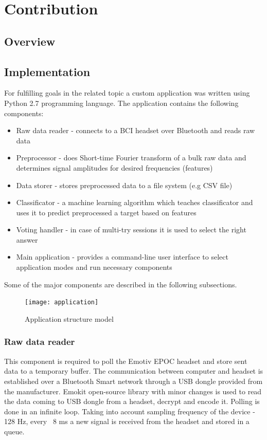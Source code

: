 \documentclass[12pt]{article}
\begin{document}
\newpage
\section{Contribution}

\subsection{Overview}


\subsection{Implementation}

For fulfilling goals in the related topic a custom application was written using Python 2.7 programming language. The application contains the following components:
\begin{itemize}
\item Raw data reader - connects to a BCI headset over Bluetooth and reads raw data
\item Preprocessor -  does Short-time Fourier transform of a bulk raw data and determines signal amplitudes for desired frequencies (features)
\item Data storer - stores preprocessed data to a file system (e.g CSV file)
\item Classificator - a machine learning algorithm which teaches classificator and uses it to predict preprocessed a target based on features
\item Voting handler - in case of multi-try sessions it is used to select the right answer
\item Main application - provides a command-line user interface to select application modes and run necessary components
\end{itemize}

Some of the major components are described in the following subsections.
\begin{figure} [ht]
\begin{center}
\texttt{[image: application]}
\caption{Application structure model}
\label{fig:fnCompModel}
\end{center}
\end{figure}

\subsubsection{Raw data reader}

This component is required to poll the Emotiv EPOC headset and store sent data to a temporary buffer. The communication between computer and headset is established over a Bluetooth Smart network through a USB dongle provided from the manufacturer. Emokit\cite{emokit} open-source library with minor changes is used to read the data coming to USB dongle from a headset, decrypt and encode it. Polling is done in an infinite loop. Taking into account sampling frequency of the device - 128 Hz, every ~8 ms a new signal is received from the headset and stored in a queue.
\end{document}
